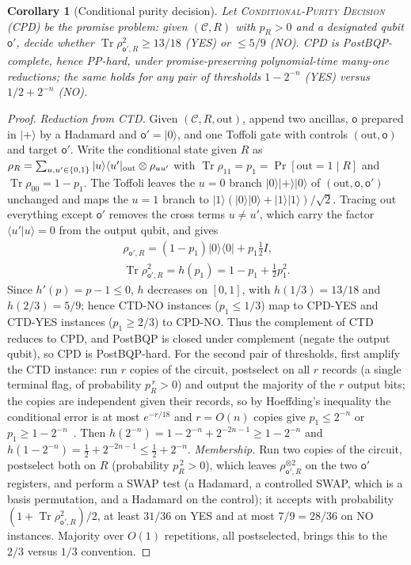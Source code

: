 \documentclass[aps,prx,reprint,superscriptaddress,nobibnotes,longbibliography]{revtex4-2}
\newtheorem{corollary}{Corollary}
\theoremstyle{remark}
\newcommand{\Tr}{\operatorname{Tr}}
\begin{document}
\begin{corollary}[Conditional purity decision]
\label{cor:cpd}
Let \textsc{Conditional-Purity Decision} (CPD) be the promise problem: given $(\mathcal C,R)$ with $p_R>0$ and a designated qubit $\mathsf o'$, decide whether $\Tr\rho_{\mathsf o',R}^2\ge13/18$ (YES) or $\le5/9$ (NO).  CPD is PostBQP-complete, hence PP-hard, under promise-preserving polynomial-time many-one reductions; the same holds for any pair of thresholds $1-2^{-n}$ (YES) versus $1/2+2^{-n}$ (NO).
\end{corollary}

\begin{proof}
\emph{Reduction from CTD.}  Given $(\mathcal C,R,\mathrm{out})$, append two ancillas, $\mathsf o$ prepared in $|+\rangle$ by a Hadamard and $\mathsf o'=|0\rangle$, and one Toffoli gate with controls $(\mathrm{out},\mathsf o)$ and target $\mathsf o'$.  Write the conditional state given $R$ as $\rho_R=\sum_{u,u'\in\{0,1\}}|u\rangle\langle u'|_{\rm out}\otimes\rho_{uu'}$ with $\Tr\rho_{11}=p_1=\Pr[\mathrm{out}=1\mid R]$ and $\Tr\rho_{00}=1-p_1$.  The Toffoli leaves the $u=0$ branch $|0\rangle|+\rangle|0\rangle$ of $(\mathrm{out},\mathsf o,\mathsf o')$ unchanged and maps the $u=1$ branch to $|1\rangle(|0\rangle|0\rangle+|1\rangle|1\rangle)/\sqrt2$.  Tracing out everything except $\mathsf o'$ removes the cross terms $u\ne u'$, which carry the factor $\langle u'|u\rangle=0$ from the output qubit, and gives
\begin{gather*}
 \rho_{\mathsf o',R}=(1-p_1)|0\rangle\langle0|+p_1\tfrac12I,\\
 \Tr\rho_{\mathsf o',R}^2=h(p_1)=1-p_1+\tfrac12p_1^2 .
\end{gather*}
Since $h'(p)=p-1\le0$, $h$ decreases on $[0,1]$, with $h(1/3)=13/18$ and $h(2/3)=5/9$; hence CTD-NO instances ($p_1\le1/3$) map to CPD-YES and CTD-YES instances ($p_1\ge2/3$) to CPD-NO.  Thus the complement of CTD reduces to CPD, and PostBQP is closed under complement (negate the output qubit), so CPD is PostBQP-hard.  For the second pair of thresholds, first amplify the CTD instance: run $r$ copies of the circuit, postselect on all $r$ records (a single terminal flag, of probability $p_R^{\,r}>0$) and output the majority of the $r$ output bits; the copies are independent given their records, so by Hoeffding's inequality the conditional error is at most $e^{-r/18}$ and $r=O(n)$ copies give $p_1\le2^{-n}$ or $p_1\ge1-2^{-n}$~\cite{Aaronson2005}.  Then $h(2^{-n})=1-2^{-n}+2^{-2n-1}\ge1-2^{-n}$ and $h(1-2^{-n})=\frac12+2^{-2n-1}\le\frac12+2^{-n}$.  \emph{Membership.}  Run two copies of the circuit, postselect both on $R$ (probability $p_R^{\,2}>0$), which leaves $\rho_{\mathsf o',R}^{\otimes2}$ on the two $\mathsf o'$ registers, and perform a SWAP test (a Hadamard, a controlled SWAP, which is a basis permutation, and a Hadamard on the control); it accepts with probability $(1+\Tr\rho_{\mathsf o',R}^2)/2$, at least $31/36$ on YES and at most $7/9=28/36$ on NO instances.  Majority over $O(1)$ repetitions, all postselected, brings this to the $2/3$ versus $1/3$ convention.
\end{proof}
\end{document}

